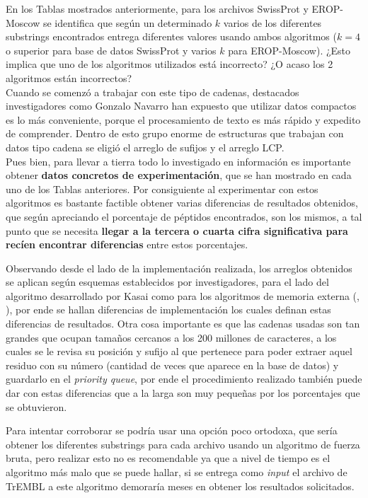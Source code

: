 En los Tablas mostrados anteriormente, para los archivos SwissProt y EROP-Moscow se identifica que según un determinado $k$ varios de los diferentes substrings encontrados entrega diferentes valores usando ambos algoritmos ($k=4$ o superior para base de datos SwissProt y varios $k$ para EROP-Moscow). ¿Esto implica que uno de los algoritmos utilizados está incorrecto? ¿O acaso los 2 algoritmos están incorrectos?\\
Cuando se comenzó a trabajar con este tipo de cadenas, destacados investigadores como Gonzalo Navarro \cite{navarro2016} han expuesto que utilizar datos compactos es lo más conveniente, porque el procesamiento de texto es más rápido y expedito de comprender. Dentro de esto grupo enorme de estructuras que trabajan con datos tipo cadena se eligió el arreglo de sufijos y el arreglo LCP.\\
Pues bien, para llevar a tierra todo lo investigado en información es importante obtener \textbf{datos concretos de experimentación}, que se han mostrado en cada uno de los Tablas anteriores. Por consiguiente al experimentar con estos algoritmos es bastante factible obtener varias diferencias de resultados obtenidos, que según apreciando el porcentaje de péptidos encontrados, son los mismos, a tal punto que se necesita \textbf{llegar a la tercera o cuarta cifra significativa para recíen encontrar diferencias} entre estos porcentajes.

Observando desde el lado de la implementación realizada, los arreglos obtenidos se aplican según esquemas establecidos por investigadores, para el lado del algoritmo desarrollado por Kasai \cite{kasai} como para los algoritmos de memoria externa (\cite{sascan}, \cite{emsparse}), por ende se hallan diferencias de implementación los cuales definan estas diferencias de resultados. Otra cosa importante es que las cadenas usadas son tan grandes que ocupan tamaños cercanos a los 200 millones de caracteres, a los cuales se le revisa su posición y sufijo al que pertenece para poder extraer aquel residuo con su número (cantidad de veces que aparece en la base de datos) y guardarlo en el \textit{priority queue}, por ende el procedimiento realizado también puede dar con estas diferencias que a la larga son muy pequeñas por los porcentajes que se obtuvieron.

Para intentar corroborar se podría usar una opción poco ortodoxa, que sería obtener los diferentes substrings para cada archivo usando un algoritmo de fuerza bruta, pero realizar esto no es recomendable ya que a nivel de tiempo es el algoritmo más malo que se puede hallar, si se entrega como \textit{input} el archivo de TrEMBL a este algoritmo demoraría meses en obtener los resultados solicitados.

